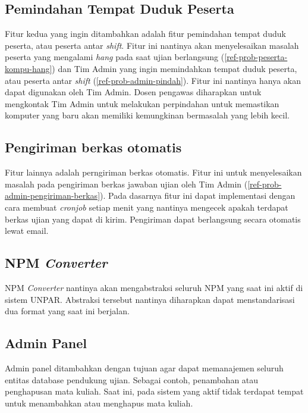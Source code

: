     \subsection{Pemindahan Tempat Duduk Peserta}
        Fitur kedua yang ingin ditambahkan adalah fitur pemindahan tempat duduk
        peserta, atau peserta antar \textit{shift}. Fitur ini nantinya akan
        menyelesaikan masalah peserta yang mengalami \textit{hang} pada saat
        ujian berlangsung (\ref{ref-prob-peserta-kompu-hang}) dan Tim Admin yang
        ingin memindahkan tempat duduk peserta, atau peserta antar
        \textit{shift} (\ref{ref-prob-admin-pindah}). Fitur ini nantinya hanya
        akan dapat digunakan oleh Tim Admin. Dosen pengawas diharapkan untuk
        mengkontak Tim Admin untuk melakukan perpindahan untuk memastikan
        komputer yang baru akan memiliki kemungkinan bermasalah yang lebih
        kecil.

    \subsection{Pengiriman berkas otomatis}
        Fitur lainnya adalah perngiriman berkas otomatis. Fitur ini untuk
        menyelesaikan masalah pada pengiriman berkas jawaban ujian oleh Tim
        Admin (\ref{ref-prob-admin-pengiriman-berkas}). Pada dasarnya fitur ini
        dapat implementasi dengan cara membuat \textit{cronjob} setiap menit
        yang nantinya mengecek apakah terdapat berkas ujian yang dapat di kirim.
        Pengiriman dapat berlangsung secara otomatis lewat email.

    \subsection{NPM \textit{Converter}} NPM \textit{Converter} nantinya akan
        mengabstraksi seluruh NPM yang saat ini aktif di sistem UNPAR. Abstraksi
        tersebut nantinya diharapkan dapat menstandarisasi dua format yang saat
        ini berjalan.
        
    \subsection{Admin Panel}
        Admin panel ditambahkan dengan tujuan agar dapat memanajemen seluruh
        entitas database pendukung ujian. Sebagai contoh, penambahan atau
        penghapusan mata kuliah. Saat ini, pada sistem yang aktif tidak terdapat
        tempat untuk menambahkan atau menghapus mata kuliah.
    
